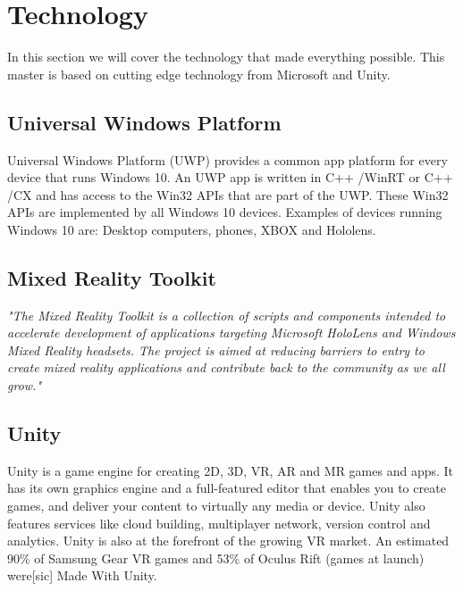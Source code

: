 
\section{Technology}
In this section we will cover the technology that made everything possible. This master is based on cutting edge technology from Microsoft and Unity.

    \subsection{Universal Windows Platform}
    Universal Windows Platform (UWP) provides a common app platform for every device that runs Windows 10. An UWP app is written in C++ /WinRT or C++ /CX and has access to the Win32 APIs that are part of the UWP. These Win32 APIs are implemented by all Windows 10 devices.\cite{wdc-UWP} Examples of devices running Windows 10 are: Desktop computers, phones, XBOX and Hololens.
    
    \subsection{Mixed Reality Toolkit}
    \emph{"The Mixed Reality Toolkit is a collection of scripts and components intended to accelerate development of applications targeting Microsoft HoloLens and Windows Mixed Reality headsets. The project is aimed at reducing barriers to entry to create mixed reality applications and contribute back to the community as we all grow."}\cite{MRToolkitReadme}

    \subsection{Unity}
    Unity is a game engine for creating 2D, 3D, VR, AR and MR games and apps. It has its own graphics engine and a full-featured editor that enables you to create games, and deliver your content to virtually any media or device. Unity also features services like cloud building, multiplayer network, version control and analytics. Unity is also at the forefront of the growing VR market. An estimated 90\% of Samsung Gear VR games and 53\% of Oculus Rift (games at launch) were[sic] Made With Unity. \cite{UnityAbout}
    
